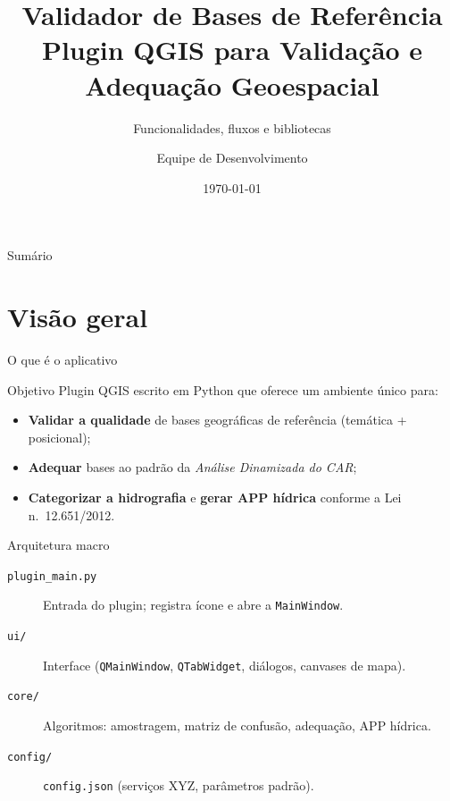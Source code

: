 \documentclass[10pt,aspectratio=169]{beamer}
\title[Validador de Bases]{Validador de Bases de Referência\\
\large Plugin QGIS para Validação e Adequação Geoespacial}
\subtitle{Funcionalidades, fluxos e bibliotecas}
\author{Equipe de Desenvolvimento}
\institute{Apresentação técnica para discussão de portabilidade Web}
\date{\today}
\begin{document}
\begin{frame}
  \titlepage
\end{frame}

\begin{frame}{Sumário}
  \tableofcontents
\end{frame}

\section{Visão geral}
\begin{frame}{O que é o aplicativo}
  \begin{block}{Objetivo}
    Plugin QGIS escrito em Python que oferece um ambiente único para:
    \begin{itemize}
      \item \textbf{Validar a qualidade} de bases geográficas de referência (temática + posicional);
      \item \textbf{Adequar} bases ao padrão da \emph{Análise Dinamizada do CAR};
      \item \textbf{Categorizar a hidrografia} e \textbf{gerar APP hídrica} conforme a Lei n.\ 12.651/2012.
    \end{itemize}
  \end{block}

  \begin{block}{Arquitetura macro}
    \begin{description}
      \item[\texttt{plugin\_main.py}] Entrada do plugin; registra ícone e abre a \texttt{MainWindow}.
      \item[\texttt{ui/}] Interface (\texttt{QMainWindow}, \texttt{QTabWidget}, diálogos, canvases de mapa).
      \item[\texttt{core/}] Algoritmos: amostragem, matriz de confusão, adequação, APP hídrica.
      \item[\texttt{config/}] \texttt{config.json} (serviços XYZ, parâmetros padrão).
    \end{description}
  \end{block}
\end{frame}
\end{document}
